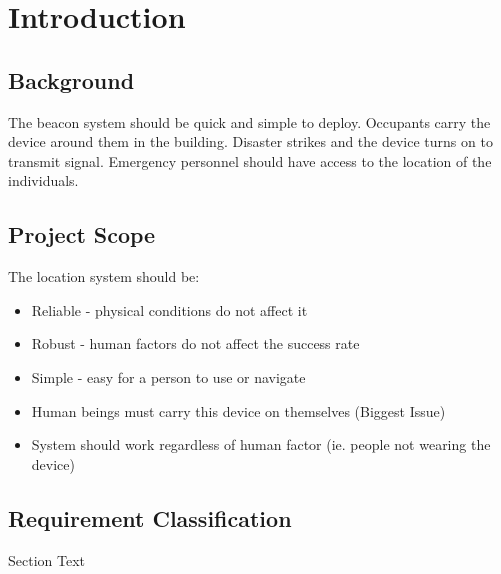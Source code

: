 
\setcounter{section}{0}
	\section{Introduction}
	\bigskip
	
	\subsection{Background}
	The beacon system should be quick and simple to deploy. 
	Occupants carry the device around them in the building. 
	Disaster strikes and the device turns on to transmit signal.
	Emergency personnel should have access to the location of the individuals.


	
	
	\break
	\subsection{Project Scope}
	The location system should be:
	\begin{itemize}
		\item Reliable - physical conditions do not affect it
		\item Robust - human factors do not affect the success rate
		\item Simple - easy for a person to use or navigate
		\item Human beings must carry this device on themselves (Biggest Issue)
		\item System should work regardless of human factor (ie. people not wearing the device)
	\end{itemize}

	
	
	\break
	\subsection{Requirement Classification}
	Section Text